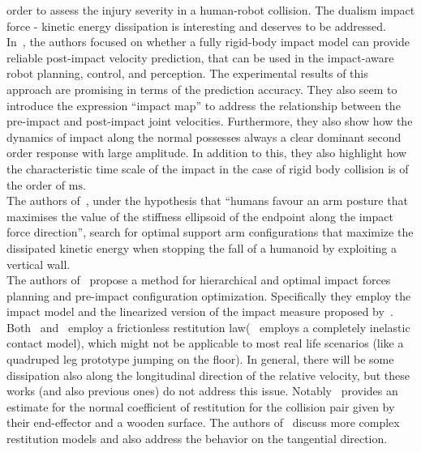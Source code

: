 \documentclass[letterpaper, 10 pt, conference]{ieeeconf}  %
\begin{document}
order to assess the injury severity in a human-robot collision. The dualism impact force - kinetic energy dissipation is interesting and deserves to be addressed.\\
In~\cite{impact_dyn::aouaj2021postimpact}, the authors focused on whether a fully rigid-body impact model can provide reliable post-impact
velocity prediction, that can be used in the impact-aware
robot planning, control, and perception. The experimental
results of this approach are promising in terms of the
prediction accuracy. They also seem to introduce the expression \enquote{impact map} to address the relationship between the pre-impact and post-impact joint velocities. Furthermore, they also show how the dynamics of impact along the normal possesses always a clear
dominant second order response with large amplitude.
In addition to this, they also highlight how the characteristic time scale of the impact in the case of rigid body collision is of the order of $\mathrm{ms}$.\\
The authors of~\cite{biomech::cui2021human}, under the hypothesis that \enquote{humans favour an arm posture that maximises the value of the stiffness ellipsoid of the endpoint along the impact force direction}, search for optimal support arm configurations that maximize the dissipated kinetic energy when stopping the fall of a humanoid by exploiting a vertical wall.\\
The authors of~\cite{impact_dyn::tassi2022impact} propose a method for hierarchical and optimal impact forces planning and pre-impact configuration optimization. Specifically they employ the impact model and the linearized version of the impact measure proposed by~\cite{impact_dyn::walker1994impact}. Both~\cite{impact_dyn::aouaj2021postimpact} and~\cite{impact_dyn::tassi2022impact} employ a frictionless restitution law(~\cite{impact_dyn::aouaj2021postimpact} employs a completely inelastic contact model), which might not be applicable to most real life scenarios (like a quadruped leg prototype jumping on the floor). In general, there will be some dissipation also along the longitudinal direction of the relative velocity, but these works (and also previous ones) do not address this issue. Notably~\cite{impact_dyn::tassi2022impact} provides an estimate for the normal coefficient of restitution for the collision pair given by their end-effector and a wooden surface. The authors of~\cite{impact_dyn::yan_bin2019batting} discuss more complex restitution models and also address the behavior on the tangential direction.
\end{document}
